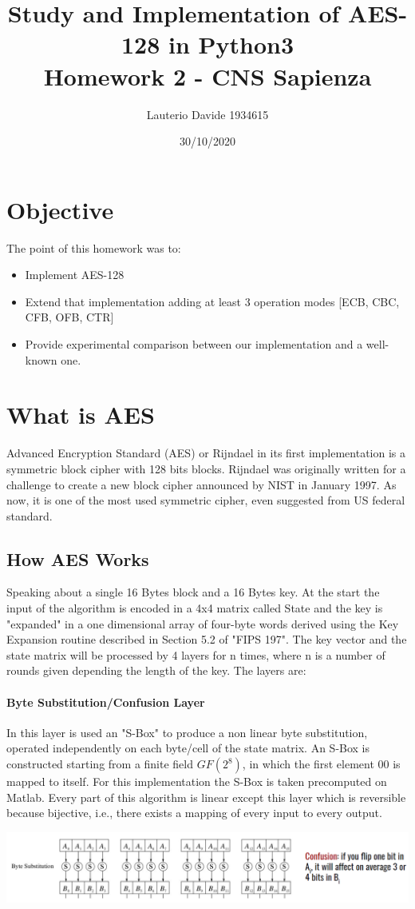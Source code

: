 \documentclass[11 pt]{article}
\title{
	Study and Implementation of AES-128 in Python3 \\
	\large Homework 2 - CNS Sapienza}
\author{Lauterio Davide 1934615}
\date{30/10/2020}
\begin{document}
\maketitle


\section{Objective}
The point of this homework was to:
\begin{itemize}
\item Implement AES-128
\item Extend that implementation adding at least 3 operation modes [ECB, CBC, CFB, OFB, CTR]
\item Provide experimental comparison between our implementation and a well-known one.
\end{itemize}


\section{What is AES}

Advanced Encryption Standard (AES) or Rijndael in its first implementation is a symmetric block cipher with 128 bits blocks.
Rijndael was originally written for a challenge to create a new block cipher announced by NIST in January 1997.
As now, it is one of the most used symmetric cipher, even suggested from US federal standard.

\subsection{How AES Works}
Speaking about a single 16 Bytes block and a 16 Bytes key.
At the start the input of the algorithm is encoded in a 4x4 matrix called State and the key is "expanded" in a one dimensional array of four-byte words derived using the Key Expansion routine described in Section 5.2 of "FIPS 197".
The key vector and the state matrix will be processed by 4 layers for n times, where n is a number of rounds given depending the length of the key.
The layers are: 
\paragraph{Byte Substitution/Confusion Layer}
In this layer is used an "S-Box" to produce a non linear byte substitution, operated independently on each byte/cell of the state matrix.
An S-Box is constructed starting from a finite  field  $GF(2^8)$, in which the first element {00} is mapped to itself. For this implementation the S-Box is taken precomputed on Matlab.
Every part of this algorithm is linear except this layer which is reversible because bijective, i.e., there exists a mapping of every input to every output.
\begin{center}
\includegraphics[width=1\textwidth]{ByteSub_Slides.png}
\end{center}
\end{document}
